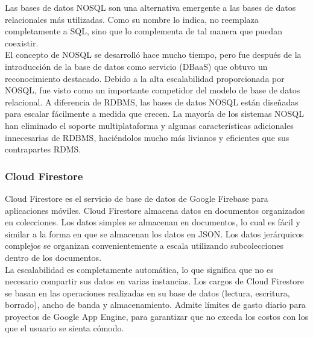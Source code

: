 Las bases de datos NOSQL son una alternativa emergente a las bases de datos relacionales más utilizadas. 
Como su nombre lo indica, no reemplaza completamente a SQL, 
sino que lo complementa de tal manera que puedan coexistir. \\[0.3cm]
El concepto de NOSQL se desarrolló hace mucho tiempo, 
pero fue después de la introducción de la base de datos como servicio (DBaaS) 
que obtuvo un reconocimiento destacado. Debido a la alta escalabilidad proporcionada por NOSQL, 
fue visto como un importante competidor del modelo de base de datos relacional. 
A diferencia de RDBMS, las bases de datos NOSQL están diseñadas para escalar fácilmente a medida que crecen. 
La mayoría de los sistemas NOSQL han eliminado el soporte multiplataforma 
y algunas características adicionales innecesarias de RDBMS, 
haciéndolos mucho más livianos y eficientes que sus contrapartes RDMS.
\subsubsection{Cloud Firestore}
Cloud Firestore es el servicio de base de datos de Google Firebase para aplicaciones móviles. 
Cloud Firestore almacena datos en documentos organizados en colecciones. 
Los datos simples se almacenan en documentos, 
lo cual es fácil y similar a la forma en que se almacenan los datos en JSON. 
Los datos jerárquicos complejos se organizan convenientemente a escala utilizando subcolecciones 
dentro de los documentos. \\[0.3cm]
La escalabilidad es completamente automática, 
lo que significa que no es necesario compartir sus datos en varias instancias. 
Los cargos de Cloud Firestore se basan en las operaciones realizadas en su base de datos 
(lectura, escritura, borrado), ancho de banda y almacenamiento. 
Admite límites de gasto diario para proyectos de Google App Engine, 
para garantizar que no exceda los costos con los que el usuario se sienta cómodo.